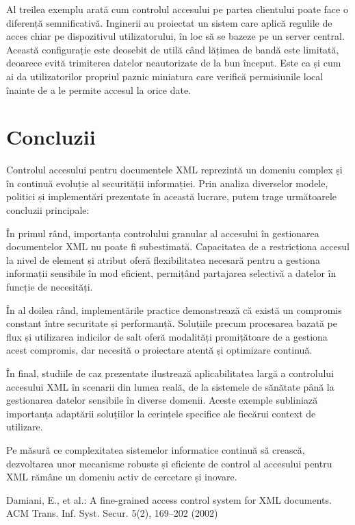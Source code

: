 \documentclass[runningheads]{llncs}
\begin{document}
\begin{spacing}{1.5}
Al treilea exemplu arată cum controlul accesului pe partea clientului poate face o diferență semnificativă. Inginerii au proiectat un sistem care aplică regulile de acces chiar pe dispozitivul utilizatorului, în loc să se bazeze pe un server central. Această configurație este deosebit de utilă când lățimea de bandă este limitată, deoarece evită trimiterea datelor neautorizate de la bun început. Este ca și cum ai da utilizatorilor propriul paznic miniatura care verifică permisiunile local înainte de a le permite accesul la orice date.

\section{Concluzii}
Controlul accesului pentru documentele XML reprezintă un domeniu complex și în continuă evoluție al securității informației. Prin analiza diverselor modele, politici și implementări prezentate în această lucrare, putem trage următoarele concluzii principale:

În primul rând, importanța controlului granular al accesului în gestionarea documentelor XML nu poate fi subestimată. Capacitatea de a restricționa accesul la nivel de element și atribut oferă flexibilitatea necesară pentru a gestiona informații sensibile în mod eficient, permițând partajarea selectivă a datelor în funcție de necesități.

În al doilea rând, implementările practice demonstrează că există un compromis constant între securitate și performanță. Soluțiile precum procesarea bazată pe flux și utilizarea indicilor de salt oferă modalități promițătoare de a gestiona acest compromis, dar necesită o proiectare atentă și optimizare continuă.

În final, studiile de caz prezentate ilustrează aplicabilitatea largă a controlului accesului XML în scenarii din lumea reală, de la sistemele de sănătate până la gestionarea datelor sensibile în diverse domenii. Aceste exemple subliniază importanța adaptării soluțiilor la cerințele specifice ale fiecărui context de utilizare.

Pe măsură ce complexitatea sistemelor informatice continuă să crească, dezvoltarea unor mecanisme robuste și eficiente de control al accesului pentru XML rămâne un domeniu activ de cercetare și inovare.


\begin{thebibliography}{9}

    Damiani, E., et al.: A fine-grained access control system for XML documents. ACM Trans. Inf. Syst. Secur. 5(2), 169--202 (2002)
    

\end{thebibliography}
\end{spacing}
\end{document}
